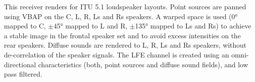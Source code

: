 This receiver renders for ITU 5.1 loudspeaker layouts. Point sources
are panned using VBAP on the C, L, R, Ls and Rs speakers. A warped
space is used (0° mapped to C, $\pm$45° mapped to L and R, $\pm$135°
mapped to Ls and Rs) to achieve a stable image in the frontal speaker
set and to avoid excess intensities on the rear speakers. Diffuse
sounds are rendered to L, R, Ls and Rs speakers, without
de-correlation of the speaker signals. The LFE channel is created
using an omni-directional characteristics (both, point sources and
diffuse sound fields), and low pass filtered.


